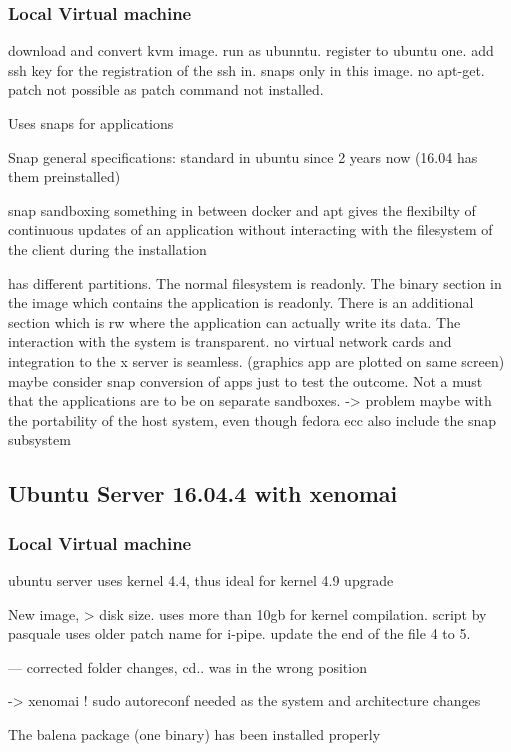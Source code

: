 \documentclass[]{scrartcl}
\begin{document}
\subsubsection{Local Virtual machine}
download and convert kvm image. run as ubunntu. register to ubuntu one. add ssh key for the registration of the ssh in. snaps only in this image. no apt-get. patch not possible as patch command not installed.

Uses snaps for applications

Snap general specifications:
standard in ubuntu since 2 years now (16.04 has them preinstalled)

snap sandboxing
something in between docker and apt
gives the flexibilty of continuous updates of an application without interacting with the filesystem of the client during the installation

has different partitions. The normal filesystem is readonly. The binary section in the image which contains the application is readonly. There is an additional section which is rw where the application can actually write its data. 
The interaction with the system is transparent. no virtual network cards and integration to the x server is seamless. (graphics app are plotted on same screen)
maybe consider snap conversion of apps just to test the outcome. Not a must that the applications are to be on separate sandboxes. -> problem maybe with the portability of the host system, even though fedora ecc also include the snap subsystem

\subsection{Ubuntu Server 16.04.4 with xenomai}


\subsubsection{Local Virtual machine}

ubuntu server uses kernel 4.4, thus ideal for kernel 4.9 upgrade

New image, > disk size. uses more than 10gb for kernel compilation. script by pasquale uses older patch name for i-pipe. update the end of the file 4 to 5.

--- corrected folder changes, cd.. was in the wrong position

-> xenomai ! sudo autoreconf
needed as the system and architecture changes

The balena package (one binary) has been installed properly
\end{document}
